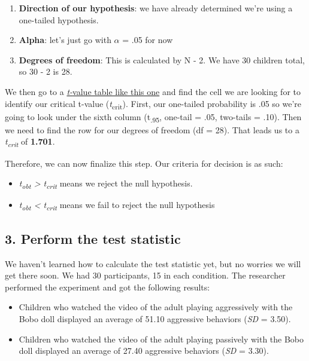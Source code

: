 \documentclass[
]{book}
\providecommand{\tightlist}{%
  \setlength{\itemsep}{0pt}\setlength{\parskip}{0pt}}
\begin{document}
\begin{enumerate}
\def\labelenumi{\arabic{enumi}.}
\tightlist
\item
  \textbf{Direction of our hypothesis}: we have already determined we're using a one-tailed hypothesis.
\item
  \textbf{Alpha}: let's just go with \(\alpha\) = .05 for now
\item
  \textbf{Degrees of freedom}: This is calculated by N - 2. We have 30 children total, so 30 - 2 is 28.
\end{enumerate}

We then go to a \href{http://www.z-table.com/t-value-table.html}{\emph{t-}value table like this one} and find the cell we are looking for to identify our critical t-value (\emph{t}\textsubscript{crit}). First, our one-tailed probability is .05 so we're going to look under the sixth column (t\textsubscript{.95}, one-tail = .05, two-tails = .10). Then we need to find the row for our degrees of freedom (df = 28). That leads us to a \emph{t\textsubscript{crit}} of \textbf{1.701}.

Therefore, we can now finalize this step. Our criteria for decision is as such:

\begin{itemize}
\item
  \emph{t\textsubscript{obt} \textgreater{} t\textsubscript{crit}} means we reject the null hypothesis.
\item
  \emph{t\textsubscript{obt} \textless{} t\textsubscript{crit}} means we fail to reject the null hypothesis
\end{itemize}

\hypertarget{perform-the-test-statistic}{%
\subsection{3. Perform the test statistic}\label{perform-the-test-statistic}}

We haven't learned how to calculate the test statistic yet, but no worries we will get there soon. We had 30 participants, 15 in each condition. The researcher performed the experiment and got the following results:

\begin{itemize}
\item
  Children who watched the video of the adult playing aggressively with the Bobo doll displayed an average of 51.10 aggressive behaviors (\emph{SD} = 3.50).
\item
  Children who watched the video of the adult playing passively with the Bobo doll displayed an average of 27.40 aggressive behaviors (\emph{SD} = 3.30).
\end{itemize}
\end{document}
